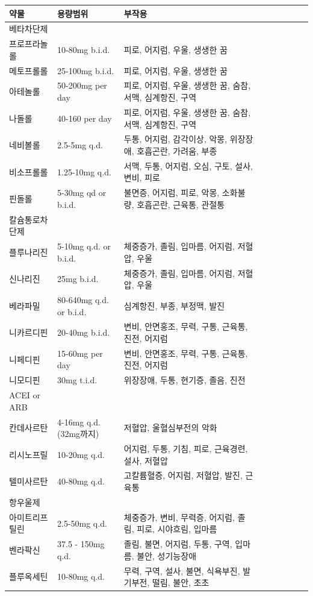 \documentclass[]{book}
\begin{document}
\begin{longtable}{lllllllll}
\toprule
약물 & 용량범위 & 부작용\\
\midrule
베타차단제 &  & \\
프로프라놀롤 & 10-80mg b.i.d. & 피로, 어지럼, 우울, 생생한 꿈\\
메토프롤롤 & 25-100mg b.i.d. & 피로, 어지럼, 우울, 생생한 꿈\\
아테놀롤 & 50-200mg per day & 피로, 어지럼, 우울, 생생한 꿈, 숨참, 서맥, 심계항진, 구역\\
나돌롤 & 40-160 per day & 피로, 어지럼, 우울, 생생한 꿈, 숨참, 서맥, 심계항진, 구역\\
\addlinespace
네비볼롤 & 2.5-5mg q.d. & 두통, 어지럼, 감각이상, 악몽, 위장장애, 호흡곤란, 가려움, 부종\\
비소프롤롤 & 1.25-10mg q.d. & 서맥, 두통, 어지럼, 오심, 구토, 설사, 변비, 피로\\
핀돌롤 & 5-30mg qd or b.i.d. & 불면증, 어지럼, 피로, 악몽, 소화불량, 호흡곤란, 근육통, 관절통\\
칼슘통로차단제 &  & \\
플루나리진 & 5-10mg q.d. or b.i.d. & 체중증가, 졸림, 입마름, 어지럼, 저혈압, 우울\\
\addlinespace
신나리진 & 25mg b.i.d. & 체중증가, 졸림, 입마름, 어지럼, 저혈압, 우울\\
베라파밀 & 80-640mg q.d. or b.i.d. & 심계항진, 부종, 부정맥, 발진\\
니카르디핀 & 20-40mg b.i.d. & 변비, 안면홍조, 무력, 구통, 근육통, 진전, 어지럼\\
니페디핀 & 15-60mg per day & 변비, 안면홍조, 무력, 구통, 근육통, 진전, 어지럼\\
니모디핀 & 30mg t.i.d. & 위장장애, 두통, 현기증, 졸음, 진전\\
\addlinespace
ACEI or ARB &  & \\
칸데사르탄 & 4-16mg q.d.(32mg까지) & 저혈압, 울혈심부전의 악화\\
리시노프릴 & 10-20mg q.d. & 어지럼, 두통, 기침, 피로, 근육경련, 설사, 저혈압\\
텔미사르탄 & 40-80mg q.d. & 고칼륨혈증, 어지럼, 저혈압, 발진, 근육통\\
항우울제 &  & \\
\addlinespace
아미트리프틸린 & 2.5-50mg q.d. & 체중증가, 변비, 무력증, 어지럼, 졸림, 피로, 시야흐림, 입마름\\
벤라팍신 & 37.5 - 150mg q.d. & 졸림, 불면, 어지럼, 두통, 구역, 입마름, 불안, 성기능장애\\
플루옥세틴 & 10-80mg q.d. & 무력, 구역, 설사, 불면, 식욕부진, 발기부전, 떨림, 불안, 초초\\

\end{longtable}
\end{document}
